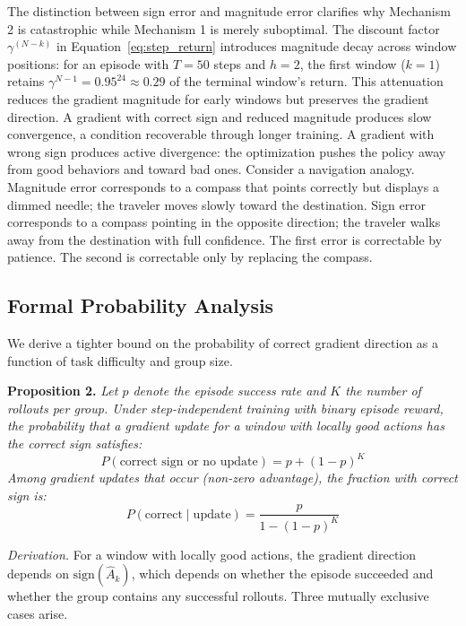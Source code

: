 The distinction between sign error and magnitude error clarifies why Mechanism 2 is catastrophic while Mechanism 1 is merely suboptimal. The discount factor $\gamma^{(N-k)}$ in Equation~\ref{eq:step_return} introduces magnitude decay across window positions: for an episode with $T=50$ steps and $h=2$, the first window ($k=1$) retains $\gamma^{N-1} = 0.95^{24} \approx 0.29$ of the terminal window's return. This attenuation reduces the gradient magnitude for early windows but preserves the gradient direction. A gradient with correct sign and reduced magnitude produces slow convergence, a condition recoverable through longer training. A gradient with wrong sign produces active divergence: the optimization pushes the policy away from good behaviors and toward bad ones. Consider a navigation analogy. Magnitude error corresponds to a compass that points correctly but displays a dimmed needle; the traveler moves slowly toward the destination. Sign error corresponds to a compass pointing in the opposite direction; the traveler walks away from the destination with full confidence. The first error is correctable by patience. The second is correctable only by replacing the compass.

\subsection{Formal Probability Analysis}
\label{sec:formal_probability}

We derive a tighter bound on the probability of correct gradient direction as a function of task difficulty and group size.

\textbf{Proposition 2.} \textit{Let $p$ denote the episode success rate and $K$ the number of rollouts per group. Under step-independent training with binary episode reward, the probability that a gradient update for a window with locally good actions has the correct sign satisfies:}
\begin{equation}
P(\text{correct sign or no update}) = p + (1-p)^{K}
\label{eq:correct_bound}
\end{equation}
\textit{Among gradient updates that occur (non-zero advantage), the fraction with correct sign is:}
\begin{equation}
P(\text{correct} \mid \text{update}) = \frac{p}{1 - (1-p)^{K}}
\label{eq:correct_conditional}
\end{equation}

\textit{Derivation.} For a window with locally good actions, the gradient direction depends on $\text{sign}(\hat{A}_k)$, which depends on whether the episode succeeded and whether the group contains any successful rollouts. Three mutually exclusive cases arise.


